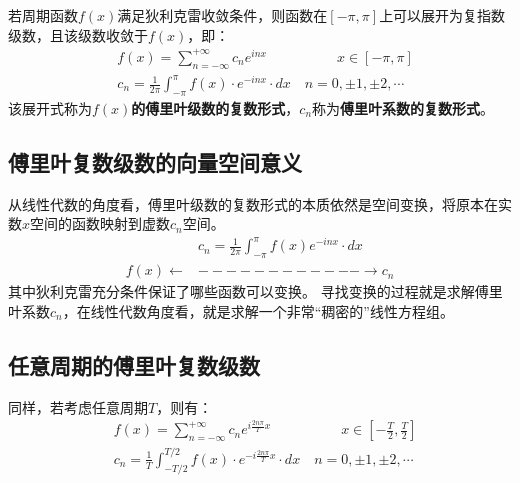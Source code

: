 \begin{definition}[傅里叶复数级数]
若周期函数$f\left( x \right) $满足狄利克雷收敛条件，则函数在$\left[ -\pi ,\pi \right] $上可以展开为复指数级数，且该级数收敛于$f\left( x \right) $，即：
\begin{align*}
&f\left( x \right) =\sum_{n=-\infty}^{+\infty}{c_ne^{inx}} \qquad \qquad \quad x\in \left[ -\pi ,\pi \right] \\
&c_n=\frac{1}{2\pi}\int_{-\pi}^{\pi}{f\left( x \right) \cdot e^{-inx}\cdot dx} \quad n=0,\pm 1,\pm 2,\cdots
\end{align*}
该展开式称为{\bf $f\left( x \right) $的傅里叶级数的复数形式}，$c_n$称为{\bf 傅里叶系数的复数形式}。
\end{definition}

\subsection{傅里叶复数级数的向量空间意义}

从线性代数的角度看，傅里叶级数的复数形式的本质依然是空间变换，将原本在实数$x$空间的函数映射到虚数$c_n$空间。
\begin{align*}
&c_n=\frac{1}{2\pi}\int_{-\pi}^{\pi}{f\left( x \right) e^{-inx}\cdot dx} \\
f\left( x \right) \gets &------------\rightarrow c_n
\end{align*}
其中狄利克雷充分条件保证了哪些函数可以变换。
寻找变换的过程就是求解傅里叶系数$c_n$，在线性代数角度看，就是求解一个非常“稠密的”线性方程组。

\subsection{任意周期的傅里叶复数级数}

同样，若考虑任意周期$T$，则有：
\begin{align*}
&f\left( x \right) =\sum_{n=-\infty}^{+\infty}{c_ne^{i\frac{2n\pi}{T}x}} \qquad \qquad \quad x\in \left[ -\frac{T}{2},\frac{T}{2} \right] \\
&c_n=\frac{1}{T}\int_{-T/2}^{T/2}{f\left( x \right) \cdot e^{-i\frac{2n\pi}{T}x}\cdot dx} \quad n=0,\pm 1,\pm 2,\cdots
\end{align*}




